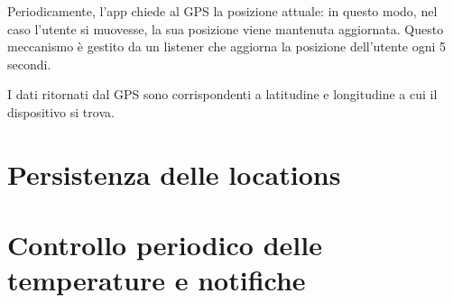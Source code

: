 \documentclass[twoside]{supsistudent}
\begin{document}
Periodicamente, l'app chiede al GPS la posizione attuale: in questo modo, nel caso l'utente si muovesse, la sua posizione viene mantenuta aggiornata. Questo meccanismo è gestito da un listener che aggiorna la posizione dell'utente ogni 5 secondi.

I dati ritornati dal GPS sono corrispondenti a latitudine e longitudine a cui il dispositivo si trova.

\section{Persistenza delle locations}
\lipsum[13]

\section{Controllo periodico delle temperature e notifiche}
\lipsum[13]
\end{document}
